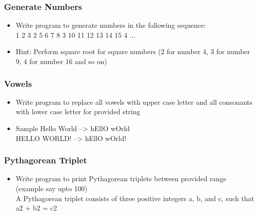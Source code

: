 \documentclass[14pt]{beamer}
\begin{document}
    \begin{frame}[containsverbatim]
        \frametitle{Generate Numbers}
        \begin{itemize}
        \item Write program to generate numbers in the following sequence:\\
        1 2 3 2 5 6 7 8 3 10 11 12 13 14 15 4 ...
        \item Hint: Perform square root for square numbers (2 for number 4, 3 for number 9, 4 for number 16 and so on)
        \end{itemize}
    \end{frame}

    \begin{frame}[containsverbatim]
        \frametitle{Vowels}
        \begin{itemize}
        \item Write program to replace all vowels with upper case letter and all consonants with lower case letter for provided string
        \item Sample
        Hello World  --> hEllO wOrld\\
        HELLO WORLD! --> hEllO wOrld!
        \end{itemize}
    \end{frame}
 

    \begin{frame}[containsverbatim]
        \frametitle{Pythagorean Triplet}
        \begin{itemize}
        \item Write program to print Pythagorean triplets between provided range (example say upto 100) \\ 
        
        
        A Pythagorean triplet consists of three positive integers a, b, and c, such that a2 + b2 = c2
        \end{itemize}
    \end{frame}
\end{document}
